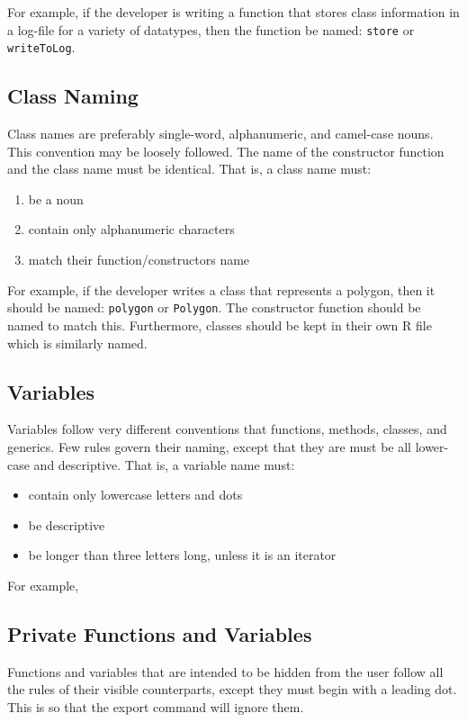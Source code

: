 For example, if the developer is writing a function that stores class information in a log-file for a variety of datatypes, then the function be named: {\tt store} or {\tt writeToLog}.



\subsection{Class Naming}
Class names are preferably single-word, alphanumeric, and camel-case nouns.  This convention may be loosely followed.  The name of the constructor function and the class name must be identical.  That is, a class name must:
{\tt\begin{enumerate}
	\item{be a noun}
	\item{contain only alphanumeric characters}
	\item{match their function/constructors name}
\end{enumerate}}

For example, if the developer writes a class that represents a polygon, then it should be named: {\tt polygon} or {\tt Polygon}.  The constructor function should be named to match this.  Furthermore, classes should be kept in their own R file which is similarly named.



\subsection{Variables}
Variables follow very different conventions that functions, methods, classes, and generics.  Few rules govern their naming, except that they are must be all lower-case and descriptive.  That is, a variable name must:
{\tt\begin{itemize}
	\item{contain only lowercase letters and dots}
	\item{be descriptive}
	\item{be longer than three letters long, unless it is an iterator}
\end{itemize}}

For example, 



\subsection{Private Functions and Variables}
Functions and variables that are intended to be hidden from the user follow all the rules of their visible counterparts, except they must begin with a leading dot.  This is so that the export command will ignore them.



